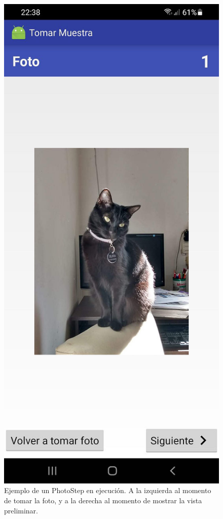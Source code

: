 \begin{figure}[H]
   \includegraphics[scale=0.3]{50-anexos/C-steps/photo_screen2.jpg}    
    \caption{Ejemplo de un PhotoStep en ejecución. A la izquierda al momento de tomar la foto, y a la derecha al momento de mostrar la vista preliminar.}
\end{figure}

